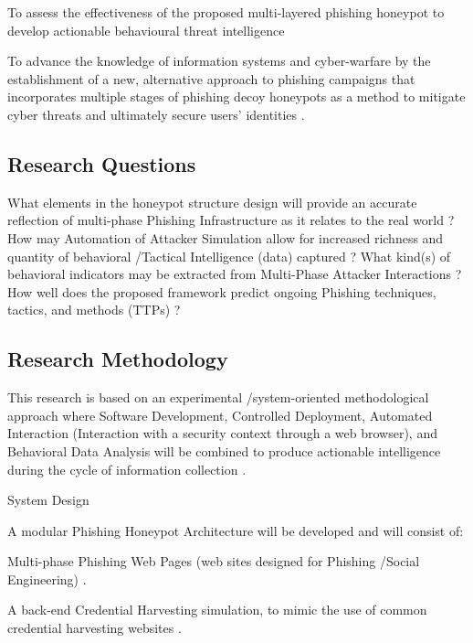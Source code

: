 To assess the effectiveness of the proposed multi-layered phishing honeypot to develop actionable behavioural threat intelligence \cite{Moric2025Honeypots}

To advance the knowledge of information systems and cyber-warfare by the establishment of a new, alternative approach to phishing campaigns that incorporates multiple stages of phishing decoy honeypots as a method to mitigate cyber threats and ultimately secure users' identities \cite{Bringer2012HoneypotSurvey}.

\subsection{Research Questions}

What elements in the honeypot structure design will provide an accurate reflection of multi-phase Phishing Infrastructure as it relates to the real world \cite{Leita2008Phishing,Provos2004ClientHoneypots}? How may Automation of Attacker Simulation allow for increased richness and quantity of behavioral /Tactical Intelligence (data) captured \cite{Kreibich2005Replay,Alata2006Honeynet}? What kind(s) of behavioral indicators may be extracted from Multi-Phase Attacker Interactions \cite{Song2005HoneyStat,Holz2006AttackPatterns}? How well does the proposed framework predict ongoing Phishing techniques, tactics, and methods (TTPs) \cite{Freiling2010Evasion,Bringer2012HoneypotSurvey}?

\subsection{Research Methodology}

This research is based on an experimental /system-oriented methodological approach where Software Development, Controlled Deployment, Automated Interaction (Interaction with a security context through a web browser), and Behavioral Data Analysis will be combined to produce actionable intelligence during the cycle of information collection \cite{Bringer2012HoneypotSurvey}.

System Design

A modular Phishing Honeypot Architecture will be developed and will consist of:

Multi-phase Phishing Web Pages (web sites designed for Phishing /Social Engineering) \cite{Leita2008Phishing}.

A back-end Credential Harvesting simulation, to mimic the use of common credential harvesting websites \cite{Provos2004ClientHoneypots}.

